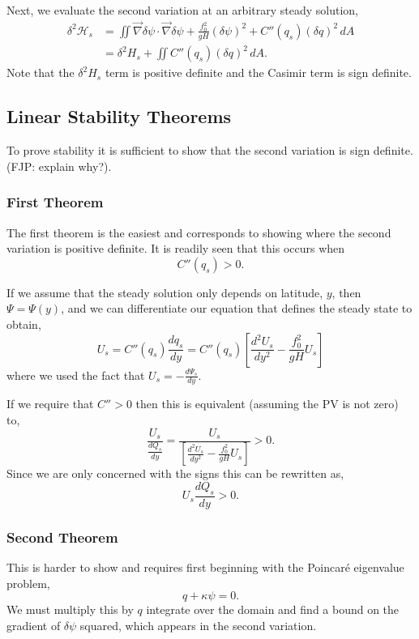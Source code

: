 \documentclass[12pt]{article}
\begin{document}
Next, we evaluate the second variation at an arbitrary steady solution,
\begin{align*}
\delta^2 \mathcal{H}_s 
& = \iint \vec\nabla \delta \psi \cdot \vec \nabla \delta \psi + \frac{f_0^2}{gH} (\delta \psi)^2+  C''(q_s) (\delta q)^2  \, dA \\
& = \delta^2 H_s + \iint C''(q_s) (\delta q)^2  \, dA.
\end{align*}
Note that the $\delta^2 H_s$ term is positive definite and the Casimir term is sign definite.

\subsection{Linear Stability Theorems}
To prove stability it is sufficient to show that the second variation is sign definite. (FJP: explain why?).  

\subsubsection{First Theorem}
The first theorem is the easiest and corresponds to showing where the second variation is positive definite.  It is readily seen that this occurs when
$$
C''(q_s) > 0.
$$

If we assume that the steady solution only depends on latitude, $y$, then $\Psi = \Psi(y)$, and we can differentiate our equation that defines the steady state to obtain,
$$
U_s = C''(q_s) \frac{dq_s}{dy} = C''(q_s) \left[ \frac{d^2 U_s}{dy^2} - \frac{f_0^2}{gH} U_s \right]
$$
where we used the fact that $U_s = - \frac{d \Psi_s}{dy}$.

If we require that $C'' > 0$ then this is equivalent (assuming the PV is not zero) to,
$$
\frac{U_s}{\frac{dQ_s}{dy}} = \frac{U_s}{\left[ \frac{d^2 U_s}{dy^2} - \frac{f_0^2}{gH} U_s\right]} > 0.
$$
Since we are only concerned with the signs this can be rewritten as,
$$
U_s \frac{d Q_s}{dy} > 0.
$$

\subsubsection{Second Theorem}
This is harder to show and requires first beginning with the Poincar\'e eigenvalue problem,
$$
q + \kappa \psi = 0.
$$
We must multiply this by $q$ integrate over the domain and find a bound on the gradient of $\delta \psi$ squared, which appears in the second variation.
\end{document}
